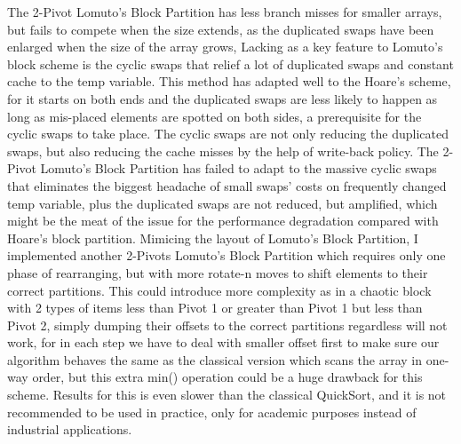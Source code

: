 \documentclass{article}
\begin{document}
The 2-Pivot Lomuto's Block Partition has less branch misses for smaller arrays, but fails to compete when the size extends, as the duplicated swaps have been enlarged when the size of the array grows, 
Lacking as a key feature to Lomuto's block scheme is the cyclic swaps that relief a lot of duplicated swaps and constant cache to the temp variable. This method has adapted well to the Hoare's scheme, for it starts on both ends and the duplicated swaps are less likely to happen as long as mis-placed elements are spotted on both sides, a prerequisite for the cyclic swaps to take place.
The cyclic swaps are not only reducing the duplicated swaps, but also reducing the cache misses by the help of write-back policy. The 2-Pivot Lomuto's Block Partition has failed to adapt to the massive cyclic swaps that eliminates the biggest headache of small swaps' costs on frequently changed temp variable, plus the duplicated swaps are not reduced, but amplified, which might be the meat of the issue for the performance degradation compared with Hoare's block partition. %
Mimicing the layout of Lomuto's Block Partition, I implemented another 2-Pivots Lomuto's Block Partition which requires only one phase of rearranging, but with more rotate-n moves to shift elements to their correct partitions. This could introduce more complexity as in a chaotic block with 2 types of items less than Pivot 1 or greater than Pivot 1 but less than Pivot 2,
simply dumping their offsets to the correct partitions regardless will not work, for in each step we have to deal with smaller offset first to make sure our algorithm behaves the same as the classical version which scans the array in one-way order, but this extra min() operation could be a huge drawback for this scheme.
Results for this is even slower than the classical QuickSort, and it is not recommended to be used in practice, only for academic purposes instead of industrial applications.
\end{document}
